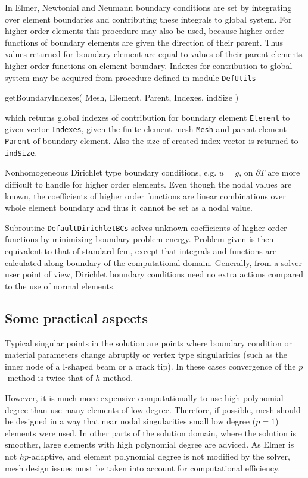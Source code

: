 In Elmer, Newtonial and Neumann boundary conditions are set by integrating over element boundaries and contributing these integrals to global system. For higher order elements this procedure may also be used, because higher order functions of boundary elements are given the direction of their parent. Thus values returned for boundary element are equal to values of their parent elements higher order functions on element boundary. Indexes for contribution to global system may be acquired from procedure defined in module \texttt{DefUtils}

\ttbegin
getBoundaryIndexes( Mesh, Element, Parent, Indexes, indSize )
\ttend

\noindent which returns global indexes of contribution for boundary element \texttt{Element} to given vector \texttt{Indexes}, given the finite element mesh \texttt{Mesh} and parent element \texttt{Parent} of boundary element. Also the size of created index vector is returned to \texttt{indSize}. 

Nonhomogeneous Dirichlet type boundary conditions, e.g. $u=g$, on $\partial T$ are more difficult to handle for higher order elements. Even though the nodal values are known, the coefficients of higher order functions are linear combinations over whole element boundary and thus it cannot be set as a nodal value.

Subroutine \texttt{DefaultDirichletBCs} solves unknown coefficients of higher order functions by minimizing boundary problem energy. Problem given is then equivalent to that of standard fem, except that integrals and functions are calculated along boundary of the computational domain. Generally, from a solver user point of view, Dirichlet boundary conditions need no extra actions compared to the use of normal elements. 

\subsection{Some practical aspects}

Typical singular points in the solution are points where boundary condition or material parameters change abruptly or vertex type singularities (such as the inner node of a l-shaped beam or a crack tip). In these cases convergence of the $p$-method is twice that of $h$-method. 

However, it is much more expensive computationally to use high polynomial degree than use many elements of low degree. Therefore, if possible,  mesh should be designed in a way that near nodal singularities small low degree ($p=1$) elements were used. In other parts of the solution domain, where the solution is smoother, large elements with high polynomial degree are adviced. As Elmer is not $hp$-adaptive, and element polynomial degree is not modified by the solver, mesh design issues must be taken into account for computational efficiency. 


